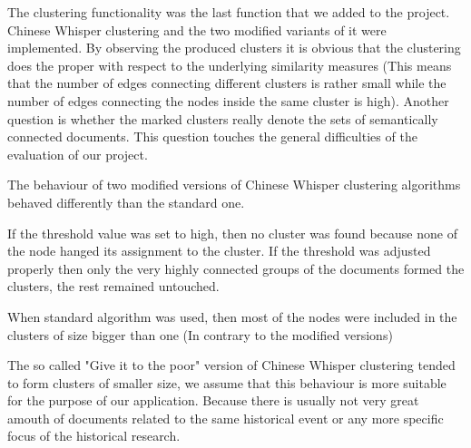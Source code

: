 The clustering functionality was the last function that we added to the project. Chinese Whisper clustering and the two modified variants of it were implemented. By observing the produced clusters it is obvious that the clustering does the proper with respect to the underlying similarity measures (This means that the number of edges connecting different clusters is rather small while the number of edges connecting the nodes inside the same cluster is high). Another question is whether the marked clusters really denote the sets of semantically connected documents. This question touches the general difficulties of the evaluation of our project. 

The behaviour of two modified versions of Chinese Whisper clustering algorithms behaved differently than the standard one. 

If the threshold value was set to high, then no cluster was found because none of the node hanged its assignment to the cluster. If the threshold was adjusted properly then only the very highly connected groups of the documents formed the clusters, the rest remained untouched. 

When standard algorithm was used, then most of the nodes were included in the clusters of size bigger than one (In contrary to the modified versions) 

The so called "Give it to the poor" version of Chinese Whisper clustering tended to form clusters of smaller size, we assume that this behaviour is more suitable for the purpose of our application. Because there is usually not very great amouth of documents related to the same historical event or any more specific focus of the historical research. 

